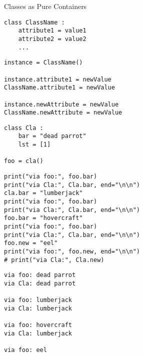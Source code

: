 \begin{frame}[fragile]{Classes as Pure Containers}
%
\begin{codebox}
\begin{verbatim}
class ClassName :
    attribute1 = value1
    attribute2 = value2
    ...
\end{verbatim}
\end{codebox}
%
\begin{codebox}
\begin{verbatim}
instance = ClassName()

instance.attribute1 = newValue
ClassName.attribute1 = newValue

instance.newAttribute = newValue
ClassName.newAttribute = newValue
\end{verbatim}
\end{codebox}
%
\end{frame}


\begin{frame}[fragile]
%
\begin{codebox}
\begin{verbatim}
class Cla :
    bar = "dead parrot"
    lst = [1]

foo = cla()
\end{verbatim}
\end{codebox}
%
\begin{tcbraster}[raster columns=2,
                  raster equal height,
                  nobeforeafter,
                  raster column skip=0.5cm]
\begin{codebox}[(... continued ...)]
\begin{verbatim}
print("via foo:", foo.bar)
print("via Cla:", Cla.bar, end="\n\n")
cla.bar = "lumberjack"
print("via foo:", foo.bar)
print("via Cla:", Cla.bar, end="\n\n")
foo.bar = "hovercraft"
print("via foo:", foo.bar)
print("via Cla:", Cla.bar, end="\n\n")
foo.new = "eel"
print("via foo:", foo.new, end="\n\n")
# print("via Cla:", Cla.new)
\end{verbatim}
\end{codebox}
%
\begin{cmdbox}
\begin{verbatim}
via foo: dead parrot
via Cla: dead parrot

via foo: lumberjack
via Cla: lumberjack

via foo: hovercraft
via Cla: lumberjack

via foo: eel
\end{verbatim}
\end{cmdbox}
\end{tcbraster}
%
\end{frame}

